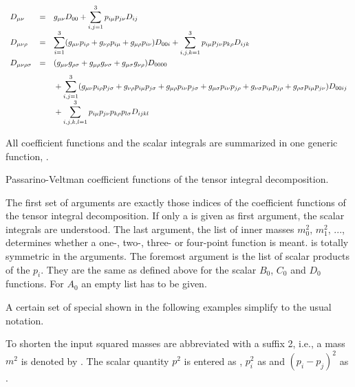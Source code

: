 \[\begin{array}{lll}
D_{\mu \nu } &=& g_{\mu \nu }D_{00}
+ \displaystyle\sum_{i,j=1}^{3} p_{i\mu} p_{j\nu }D_{ij} \\[1em]
D_{\mu \nu \rho } &=&
\displaystyle\sum_{i=1}^{3}(g_{\mu \nu }p_{i\rho }+g_{\nu \rho }p_{i\mu }
+ g_{\mu \rho }p_{i\nu }) D_{00i}
+ \sum_{i,j,k=1}^{3} p_{i\mu} p_{j\nu }p_{k\rho}D_{ijk} \\[1.4em]
D_{\mu \nu \rho \sigma } &=&
(g_{\mu\nu}g_{\rho \sigma} + g_{\mu\rho}g_{\nu \sigma }
+ g_{\mu\sigma}g_{\nu\rho }) D_{0000}\\ [.8em]
&&\mbox{}+\displaystyle\sum_{i,j=1}^{3}(g_{\mu \nu }p_{i\rho}p_{j\sigma}
+ g_{\nu \rho }p_{i\mu }p_{j\sigma} + g_{\mu \rho }p_{i\nu}p_{j\sigma}
+ g_{\mu \sigma}p_{i\nu}p_{j\rho }+ g_{\nu \sigma}p_{i\mu}p_{j\rho }
+ g_{\rho \sigma}p_{i\mu}p_{j\nu}) D_{00ij} \\[.8em]
&&\mbox{}+\displaystyle\sum_{i,j,k,l=1}^{3} p_{i\mu} p_{j\nu
}p_{k\rho}p_{l\sigma}D_{ijkl}
\end{array}
\]

All coefficient functions and the scalar integrals
are summarized in one generic function, .

 {Passarino-Veltman coefficient functions of the tensor integral decomposition.}

The first set of arguments  are exactly those 
indices of the coefficient functions of the tensor integral decomposition.
If only a  is given as first argument, the scalar integrals are 
understood. The last argument, the list of inner masses 
$m_0^2,\, m_1^2,\, ...$, determines whether a one-, two-,
three- or four-point function is meant. 
 is totally symmetric in the   arguments.
The foremost argument is the list of scalar products of the $p_i$.
They are the same as defined above for the scalar $B_0$, $C_0$ and 
$D_0$ functions. For $A_0$ an empty list has to be given.

A certain set of special  shown in the following 
examples simplify to the usual notation.

To shorten the input squared masses are abbreviated with a suffix 2,
i.e., a mass $m^2$ is denoted by .
The scalar quantity $p^2$ is entered as ,
$p_i^2$ as  and  $(p_i-p_j)^2$ as .


